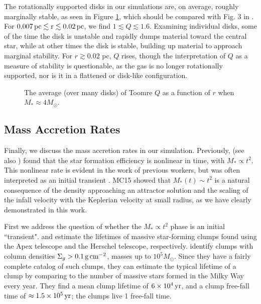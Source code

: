 \documentclass[../dissertation.tex]{subfiles}
\begin{document}
The rotationally supported disks in our simulations are, on average, 
roughly marginally stable,  
as seen in Figure \ref{fig:hydro_Q_avg}, which should be compared with Fig. 3 in \citet{2010ApJ...708.1585K}.  For $0.007\,\rm pc\lesssim r \lesssim 0.02\,\rm pc$, 
we find  $1\lesssim Q\lesssim 1.6$. Examining individual disks, some of 
the time the disk is unstable and rapidly dumps material toward the central 
star, while at other times the disk is stable, building up material to approach marginal stability. For $r\gtrsim 0.02$ pc,  $Q$  rises, though the interpretation of 
$Q$ as a measure of stability is questionable, as the gas is no longer 
rotationally supported, nor is it in a flattened or disk-like configuration. 

\begin{figure}[htb]%
\caption[Hydro Toomre Q average]{The average (over many disks) of Toomre $Q$ as a function of $r$ when  $M_*\approx 4M_{\odot}$. \label{fig:hydro_Q_avg}}
\end{figure}


\subsection{Mass Accretion Rates}

Finally, we discuss the mass accretion rates in our simulation.  Previously,
\citet{2015ApJ...800...49L} (see also \citealt{2014MNRAS.439.3420M}) found 
that the star formation efficiency is nonlinear in time, with $M_* \propto t^2$.  
This nonlinear rate is evident in the work of previous workers, but was 
often interpreted as an initial transient \citep{2011ApJ...730...40P}.  MC15 
showed that $M_*(t)\sim t^2$  is a natural consequence of the density approaching an 
attractor solution and the scaling of the infall velocity with the Keplerian 
velocity at small radius, as we have clearly demonstrated in this work.  

First we address the question of whether the $M_*\propto t^2$ phase is an initial ``transient".
\citet{2012A&A...540A.113T} and \citet{2015MNRAS.451.3089T} estimate the lifetimes of massive 
star-forming clumps found using the Apex telescope and the Herschel telescope, respectively.
\citet{2012A&A...540A.113T} identify clumps with  column densities $\Sigma_g> 0.1\,\rm g\,\rm cm^{-2}$,
masses up to $10^5M_\odot$. Since they have a fairly complete catalog of such clumps, they can
estimate the typical lifetime of a clump by comparing to the number of massive stars formed in 
the Milky Way every year. They find a mean clump lifetime of $6\times10^4\,\rm yr$, and a clump 
free-fall time of $\approx1.5\times10^5\,\rm yr$; the clumps live 1 free-fall time.
\end{document}
